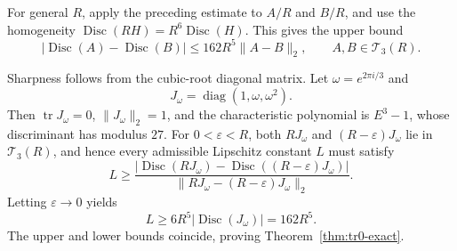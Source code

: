 \documentclass[11pt]{article}
\numberwithin{equation}{section}
\DeclareMathOperator{\Disc}{Disc}
\DeclareMathOperator{\tr}{tr}
\DeclareMathOperator{\diag}{diag}
\newcommand{\cT}{\mathcal T}
\begin{document}
For general \(R\), apply the preceding estimate to \(A/R\) and \(B/R\), and
use the homogeneity \(\Disc(RH)=R^6\Disc(H)\).  This gives the upper bound
\[
  |\Disc(A)-\Disc(B)|\le162R^5\|A-B\|_2,
  \qquad A,B\in\cT_3(R).
\]

Sharpness follows from the cubic-root diagonal matrix.  Let
\(\omega=e^{2\pi i/3}\) and
\[
  J_\omega=\diag(1,\omega,\omega^2).
\]
Then \(\tr J_\omega=0\), \(\|J_\omega\|_2=1\), and the characteristic
polynomial is \(E^3-1\), whose discriminant has modulus \(27\).  For
\(0<\varepsilon<R\), both \(RJ_\omega\) and \((R-\varepsilon)J_\omega\) lie in
\(\cT_3(R)\), and hence every admissible Lipschitz constant \(L\) must satisfy
\[
L\ge
\frac{|\Disc(RJ_\omega)-\Disc((R-\varepsilon)J_\omega)|}
     {\|RJ_\omega-(R-\varepsilon)J_\omega\|_2}.
\]
Letting \(\varepsilon\to0\) yields
\[
  L\ge 6R^5|\Disc(J_\omega)|=162R^5.
\]
The upper and lower bounds coincide, proving Theorem~\ref{thm:tr0-exact}.
\end{document}
